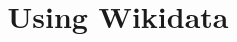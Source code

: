 \documentclass{article}
\begin{document}
\title{Using Wikidata}

\maketitle


\subsection{}\label{H3586326}
\end{document}
